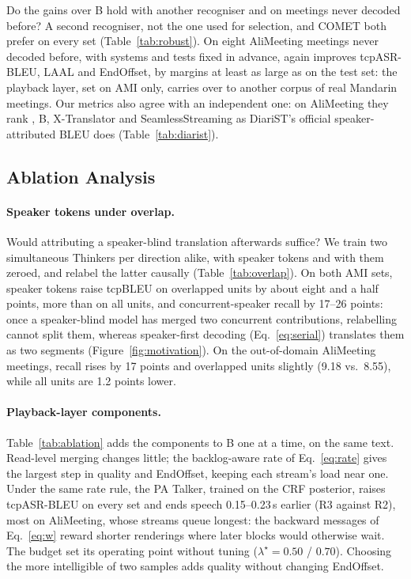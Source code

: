 Do the gains over B hold with another recogniser and on meetings never decoded before? A second
recogniser, not the one used for selection, and COMET both prefer \sys{} on every set
(Table~\ref{tab:robust}). On eight AliMeeting meetings never decoded before, with systems and tests fixed in advance,
\sys{} again improves tcpASR-BLEU, LAAL and EndOffset, by margins at least as large as on the test set: the
playback layer, set on AMI only, carries over to another corpus of real Mandarin meetings. Our metrics
also agree with an independent one: on AliMeeting they rank \sys{}, B, X-Translator and SeamlessStreaming as DiariST's
official speaker-attributed BLEU does (Table~\ref{tab:diarist}).




\subsection{Ablation Analysis}
\label{sec:res-ablation}
\label{sec:res-overlap}

\paragraph{Speaker tokens under overlap.} Would attributing a speaker-blind translation afterwards suffice? We train two simultaneous Thinkers per direction alike, with speaker tokens and with them zeroed,
and relabel the latter causally (Table~\ref{tab:overlap}). On both AMI sets, speaker tokens raise tcpBLEU on overlapped
units by about eight and a half points, more than on all units, and concurrent-speaker recall by 17--26 points: once a
speaker-blind model has merged two concurrent contributions, relabelling cannot split them, whereas speaker-first
decoding (Eq.~\eqref{eq:serial}) translates them as two segments (Figure~\ref{fig:motivation}). On the out-of-domain
AliMeeting meetings, recall rises by 17 points and overlapped units slightly (9.18 vs.\ 8.55), while all units are 1.2
points lower.

\paragraph{Playback-layer components.} Table~\ref{tab:ablation} adds the components to B one at a time, on the same
text. Read-level merging changes little; the backlog-aware rate of Eq.~\eqref{eq:rate} gives the largest step in quality
and EndOffset, keeping each stream's load near one. Under the same rate rule, the PA Talker, trained on the CRF posterior, raises
tcpASR-BLEU on every set and ends speech 0.15--0.23\,s earlier (R3 against R2), most on AliMeeting, whose streams queue
longest: the backward messages of Eq.~\eqref{eq:w} reward shorter renderings where later blocks would otherwise wait. The budget set its operating point without tuning ($\lambda^\star=0.50$ / $0.70$). Choosing the more intelligible of two samples adds quality without changing EndOffset.
